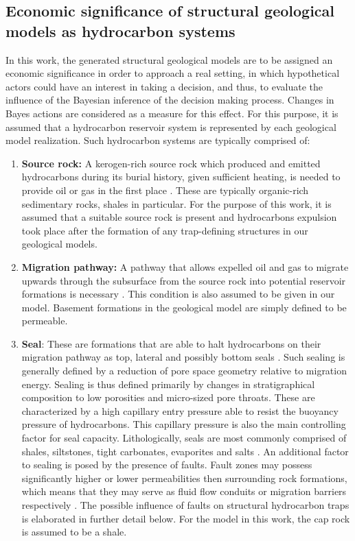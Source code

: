         \subsection{Economic significance of structural geological models as hydrocarbon systems}\label{sec:Reservoir_values}
        In this work, the generated structural geological models are to be assigned an economic significance in order to approach a real setting, in which hypothetical actors could have an interest in taking a decision, and thus, to evaluate the influence of the Bayesian inference of the decision making process. Changes in Bayes actions are considered as a measure for this effect. For this purpose, it is assumed that a hydrocarbon reservoir system is represented by each geological model realization.
        Such hydrocarbon systems are typically comprised of:
        \begin{enumerate}
        	\item \textbf{Source rock:} A kerogen-rich source rock which produced and emitted hydrocarbons during its burial history, given sufficient heating, is needed to provide oil or gas in the first place \citep{dolson2016basics, selley2014elements}. These are typically organic-rich sedimentary rocks, shales in particular. For the purpose of this work, it is assumed that a  suitable source rock is present and hydrocarbons expulsion took place after the formation of any trap-defining structures in our geological models.
        	\item \textbf{Migration pathway:} A pathway that allows expelled oil and gas to migrate upwards through the subsurface from the source rock into potential reservoir formations is necessary \citep{dolson2016basics,north1985petroleum, selley2014elements}. This condition is also assumed to be given in our model. Basement formations in the geological model are simply defined to be permeable.
        	\item \textbf{Seal}: These are formations that are able to halt hydrocarbons on their migration pathway as top, lateral and possibly bottom seals \citep{dolson2016basics, sorkhabi2005place}. Such sealing is generally defined by a reduction of pore space geometry relative to migration energy. Sealing is thus defined primarily by changes in stratigraphical composition to low porosities and micro-sized pore throats. These are characterized by a high capillary entry pressure able to resist the buoyancy pressure of hydrocarbons. This capillary pressure is also the main controlling factor for seal capacity. Lithologically, seals are most commonly comprised of shales, siltstones, tight carbonates, evaporites and salts \citep{dolson2016basics, dolson2016quantifying, sorkhabi2005place}. An additional factor to sealing is posed by the presence of faults. Fault zones may possess significantly higher or lower permeabilities then surrounding rock formations, which means that they may serve as fluid flow conduits or migration barriers respectively \citep{van2003lateral, sorkhabi2005place}. The possible influence of faults on structural hydrocarbon traps is elaborated in further detail below. For the model in this work, the cap rock is assumed to be a shale.

\end{enumerate}
